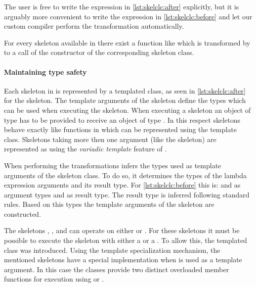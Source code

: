 The user is free to write the expression in \autoref{lst:skelclc:after} explicitly, but it is arguably more convenient to write the expression in \autoref{lst:skelclc:before} and let our custom compiler perform the transformation automatically.

For every skeleton available in \SkelCL there exist a function like  which is transformed by  to a call of the constructor of the corresponding skeleton class.

\paragraph{Maintaining type safety}
Each skeleton in \SkelCL is represented by a templated class, as seen in \autoref{lst:skelclc:after} for the \zip skeleton.
The template arguments of the skeleton define the types which can be used when executing the skeleton.
When executing a skeleton  an object of type  has to be provided to receive an object of type .
In this respect skeletons behave exactly like functions in \Cpp which can be represented using the  template class.
Skeletons taking more then one argument (like the  skeleton) are represented as  using the \emph{variadic template} feature of \Cpp.

When performing the transformations  infers the types used as template arguments of the skeleton class.
To do so, it determines the types of the lambda expression arguments and its result type.
For \autoref{lst:skelclc:before} this is:  and  as argument types and  as result type.
The result type is inferred following standard \Cpp rules.
Based on this types the template arguments of the skeleton are constructed.

The skeletons \map, \zip, and \stencil can operate on either  or .
For these skeletons it must be possible to execute the skeleton with either a  or a .
To allow this, the templated class  was introduced.
Using the template specialization mechanism, the mentioned skeletons have a special implementation when  is used as a template argument.
In this case the classes provide two distinct overloaded member functions for execution using  or .


